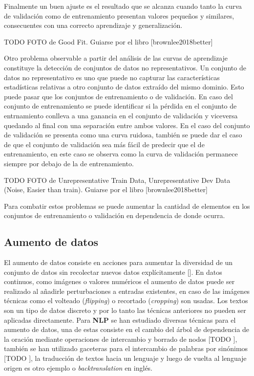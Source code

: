 Finalmente un buen ajuste es el resultado que se alcanza cuando tanto la curva de validación como de entrenamiento
presentan valores pequeños y similares, consecuentes con una correcto aprendizaje y generalización.

TODO FOTO de Good Fit. Guiarse por el libro [brownlee2018better]

Otro problema observable a partir del análisis de las curvas de aprendizaje constituye la detección de conjuntos
de datos no representativos. Un conjunto de datos no representativo es uno que puede no 
capturar las características estadísticas relativas a otro conjunto de datos extraído del mismo dominio.
Esto puede pasar que los conjuntos de entrenamiento o de validación. En caso del conjunto de entrenamiento
se puede identificar si la pérdida en el conjunto de entrnamiento conlleva a una ganancia en el conjunto de 
validación y viceversa quedando al final con una separación entre ambos valores. En el caso del conjunto de 
validación se presenta como una curva ruidosa, también se puede dar el caso de que el conjunto  de validación
sea más fácil de predecir que el de entrenamiento, en este caso se observa como la curva de validación permanece
siempre por debajo de la de entrenamiento.

TODO FOTO de Unrepresentative Train Data, Unrepresentative Dev Data (Noise, Easier than train). Guiarse por el libro [brownlee2018better]

Para combatir estos problemas se puede aumentar la cantidad de elementos en los conjuntos de entrenamiento o 
validación en dependencia de donde ocurra.

\subsection{Aumento de datos}

El aumento de datos consiste en acciones para aumentar la diversidad de un conjunto de datos sin recolectar
nuevos datos explícitamente [\cite{feng2021data}]. En datos continuos, como imágenes o valores numéricos el 
aumento de datos puede ser realizado al añadirle perturbaciones a entradas existentes, en caso de las imágenes 
técnicas como el volteado (\emph{flipping}) o recortado (\emph{cropping}) son usadas. Los textos son un tipo 
de datos discreto y por lo tanto las técnicas anteriores no pueden ser aplicadas directamente. Para \textbf{NLP}
se han estudiado diversas técnicas para el aumento de datos, una de estas consiste en el cambio del árbol de 
dependencia de la oración mediante operaciones de intercambio y borrado de nodos [TODO \cite{}], también se han utilizado 
gaceteras para el intercambio de palabras por sinónimos [TODO \cite{}], la traducción de textos hacia un lenguaje y luego 
de vuelta al lenguaje origen es otro ejemplo o \emph{backtranslation} en inglés. 

